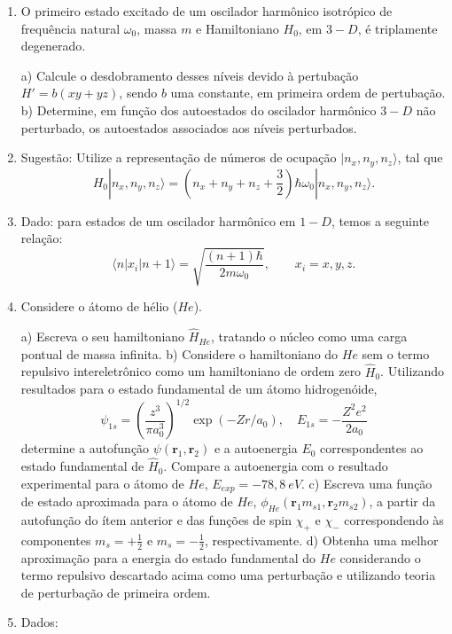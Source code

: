 \begin{enumerate}[start=1,label={\bfseries Q\arabic*.}]
\item O primeiro estado excitado de um oscilador harmônico isotrópico de frequência natural $\omega_{0}$, massa $m$ e Hamiltoniano $H_{0}$, em $3-D$, é triplamente degenerado.

  a) Calcule o desdobramento desses níveis devido à pertubação $H' = b(xy + yz)$, sendo $b$ uma constante, em primeira ordem de pertubação.
  b) Determine, em função dos autoestados do oscilador harmônico $3-D$ não perturbado, os autoestados associados aos níveis perturbados.
  \item[] Sugestão: Utilize a representação de números de ocupação $|n_{x}, n_{y}, n_{z} \rangle$, tal que
      $$
      H_{0} | n_{x}, n_{y}, n_{z} \rangle = \left( n_{x} + n_{y} + n_{z} + \frac{3}{2} \right) \hbar \omega_{0} | n_{x}, n_{y}, n_{z} \rangle.
      $$
  \item[] Dado: para estados de um oscilador harmônico em $1-D$, temos a seguinte relação:
  $$
  \langle n | x_{i} | n + 1 \rangle = \sqrt{ \frac{(n+1)\hbar}{2m\omega_{0}} }, \quad \quad x_{i} = x,y,z.
  $$





\item Considere o átomo de hélio ($He$).

a) Escreva o seu hamiltoniano $\hat{H}_{He}$, tratando o núcleo como uma carga pontual de massa infinita.
b) Considere o hamiltoniano do $He$ sem o termo repulsivo intereletrônico como um hamiltoniano de ordem zero $\hat{H}_{0}$. Utilizando resultados para o estado fundamental de um átomo hidrogenóide,
$$
\psi_{1s} = \left(  \frac{z^{3}}{\pi a_{0}^{3}}  \right)^{1/2} \operatorname{exp} (- Zr/a_{0}), \quad E_{1s} = - \frac{Z^{2} e^{2}}{2a_{0}}
$$
determine a autofunção  $\psi(\mathbf{r}_{1},\mathbf{r}_{2})$ e a autoenergia $E_{0}$ correspondentes ao estado fundamental de $\hat{H}_{0}$. Compare a autoenergia com o resultado experimental para o átomo de $He$, $E_{exp} = -78,8 \ eV$.
c) Escreva uma função de estado aproximada para o átomo de $He$,  $\phi_{He}(\mathbf{r}_{1}m_{s1},\mathbf{r}_{2}m_{s2})$, a partir da autofunção do ítem anterior e das funções de spin $\chi_{+}$ e $\chi_{-}$ correspondendo às componentes $m_{s} = +\frac{1}{2}$ e $m_{s} = -\frac{1}{2}$, respectivamente.
d) Obtenha uma melhor aproximação para a energia do estado fundamental do $He$ considerando o termo repulsivo descartado acima como uma perturbação e utilizando teoria de perturbação de primeira ordem.
\item[] Dados:


\end{enumerate}
